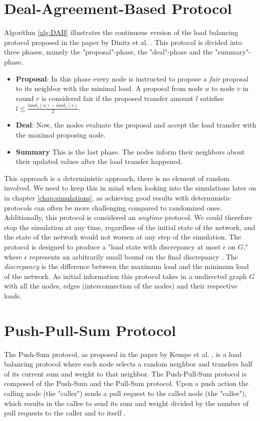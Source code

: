 

\section{Deal-Agreement-Based Protocol}
Algorithm \ref{alg:DAB} illustrates the continuous version of the load balancing protocol proposed in the paper by Dinitz et al. \cite{dinitz2022localDealAgreementloadBalancing}. This protocol is divided into three phases, namely the "proposal"-phase, the "deal"-phase and the "summary"-phase.
\begin{itemize}
    \item \textbf{Proposal}: In this phase every node is instructed to propose a \textit{fair} proposal to its neighbor with the minimal load. A proposal from node $u$ to node $v$ in round $r$ is considered fair if the proposed transfer amount $l$ satisfies $l \leq \frac{load_{r}(u) - load_{r}(v)}{2}$.
    \item \textbf{Deal}: Now, the nodes evaluate the proposal and accept the load transfer with the maximal proposing node.
    \item \textbf{Summary} This is the last phase. The nodes inform their neighbors about their updated values after the load transfer happened.
\end{itemize}
This approach is a deterministic approach, there is no element of random involved. We need to keep this in mind when looking into the simulations later on in chapter \ref{chap:simulations}, as achieving good results with deterministic protocols can often be more challenging compared to randomized ones. Additionally, this protocol is considered an \textit{anytime} protocol. We could therefore stop the simulation at any time, regardless of the initial state of the network, and the state of the network would not worsen at any step of the simulation. The protocol is designed to produce a "load state with discrepancy at most $\epsilon$ on $G$," where $\epsilon$ represents an arbitrarily small bound on the final discrepancy \cite{dinitz2022localDealAgreementloadBalancing}. The \textit{discrepancy} is the difference between the maximum load and the minimum load of the network. As initial information this protocol takes in a undirected graph $G$ with all the nodes, edges (interconnection of the nodes) and their respective loads.

\section{Push-Pull-Sum Protocol}
The Push-Sum protocol, as proposed in the paper by Kempe et al. \cite{kempe2003gossipbasedComp}, is a load balancing protocol where each node selects a random neighbor and transfers half of its current sum and weight to that neighbor. The Push-Pull-Sum protocol is composed of the Push-Sum and the Pull-Sum protocol. Upon a push action the calling node (the "caller") sends a pull request to the called node (the "callee"), which results in the callee to send its sum and weight divided by the number of pull requests to the caller and to itself \cite{nugroho2023PushPullSumDataAg}.


